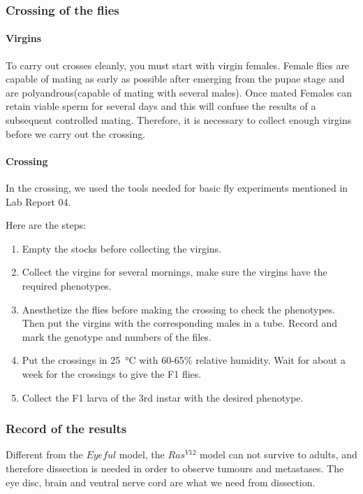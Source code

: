 \subsubsection{Crossing of the flies}

\paragraph{Virgins}
To carry out crosses cleanly, you must start with virgin females. Female flies are capable of mating as early as possible after emerging from the pupae stage and are polyandrous(capable of mating with several males). Once mated Females can retain viable sperm for several days and this will confuse the results of a subsequent controlled mating. Therefore, it is necessary to collect enough virgins before we carry out the crossing.

\paragraph{Crossing}
In the crossing, we used the tools needed for basic fly experiments mentioned in Lab Report 04.
	
Here are the steps:
	
		\begin{enumerate}
			\item Empty the stocks before collecting the virgins.
			\item Collect the virgins for several mornings, make sure the virgins have the required phenotypes.
			\item Anesthetize the flies before making the crossing to check the phenotypes. Then put the virgins with the corresponding males in a tube. Record and mark the genotype and numbers of the files.
			\item Put the crossings in \SI{25}{\celsius} with  60-65\% relative humidity. Wait for about a week for the crossings to give the F1 flies.
			\item Collect the F1 larva of the 3rd instar with the desired phenotype.
		\end{enumerate}

\subsubsection{Record of the results}
Different from the $Eyeful$ model, the $Ras^{V12}$ model can not survive to adults, and therefore dissection is needed in order to observe tumours and metastases. The eye disc, brain and ventral nerve cord are what we need from dissection.

